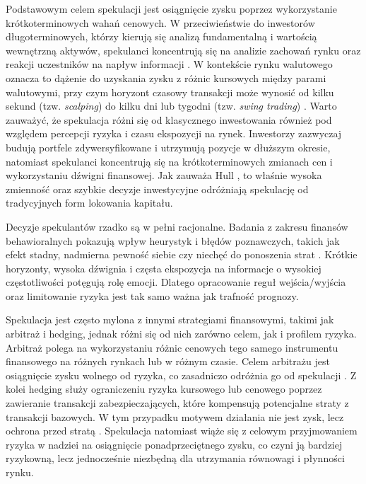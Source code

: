 Podstawowym celem spekulacji jest osiągnięcie zysku poprzez wykorzystanie krótkoterminowych wahań cenowych. 
W przeciwieństwie do inwestorów długoterminowych, którzy kierują się analizą fundamentalną i wartością wewnętrzną aktywów, spekulanci koncentrują się na analizie zachowań rynku oraz reakcji uczestników na napływ informacji \parencite{elder2014}. 
W kontekście rynku walutowego oznacza to dążenie do uzyskania zysku z różnic kursowych między parami walutowymi, 
przy czym horyzont czasowy transakcji może wynosić od kilku sekund (tzw. \emph{scalping}) do kilku dni lub tygodni (tzw. \emph{swing trading}) \parencite{murphy1999}. 
Warto zauważyć, że spekulacja różni się od klasycznego inwestowania również pod względem percepcji ryzyka i czasu ekspozycji na rynek. 
Inwestorzy zazwyczaj budują portfele zdywersyfikowane i utrzymują pozycje w dłuższym okresie, natomiast spekulanci koncentrują się na krótkoterminowych zmianach cen i wykorzystaniu dźwigni finansowej. 
Jak zauważa Hull \parencite{hull2018}, to właśnie wysoka zmienność oraz szybkie decyzje inwestycyjne odróżniają spekulację od tradycyjnych form lokowania kapitału.

Decyzje spekulantów rzadko są w pełni racjonalne. Badania z zakresu finansów behawioralnych pokazują wpływ heurystyk i błędów poznawczych, takich jak efekt stadny, 
nadmierna pewność siebie czy niechęć do ponoszenia strat \parencite{shleifer2000}. 
Krótkie horyzonty, wysoka dźwignia i częsta ekspozycja na informacje o wysokiej częstotliwości potęgują rolę emocji. 
Dlatego opracowanie reguł wejścia/wyjścia oraz limitowanie ryzyka jest tak samo ważna jak trafność prognozy.

Spekulacja jest często mylona z innymi strategiami finansowymi, takimi jak arbitraż i hedging, jednak różni się od nich zarówno celem, jak i profilem ryzyka. 
Arbitraż polega na wykorzystaniu różnic cenowych tego samego instrumentu finansowego na różnych rynkach lub w różnym czasie. 
Celem arbitrażu jest osiągnięcie zysku wolnego od ryzyka, co zasadniczo odróżnia go od spekulacji \parencite{fabozzi2015}. 
Z kolei hedging służy ograniczeniu ryzyka kursowego lub cenowego poprzez zawieranie transakcji zabezpieczających, które kompensują potencjalne straty z transakcji bazowych. 
W tym przypadku motywem działania nie jest zysk, lecz ochrona przed stratą \parencite{mishkin2019}. 
Spekulacja natomiast wiąże się z celowym przyjmowaniem ryzyka w nadziei na osiągnięcie ponadprzeciętnego zysku, co czyni ją bardziej ryzykowną, 
lecz jednocześnie niezbędną dla utrzymania równowagi i płynności rynku.

